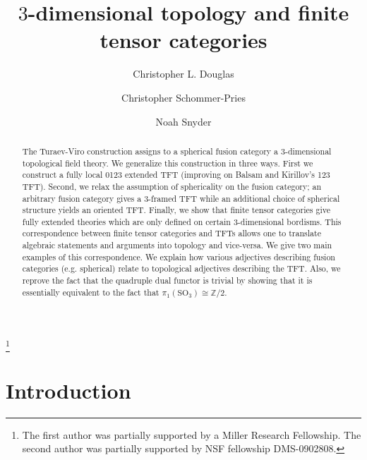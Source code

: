 \documentclass{amsart}
\begin{document}
\title{$3$-dimensional topology and finite tensor categories}

\begin{abstract}
The Turaev-Viro construction assigns to a spherical fusion category a 3-dimensional topological field theory.  We generalize this construction in three ways. First we construct a fully local 0123 extended TFT (improving on Balsam and Kirillov's 123 TFT).  Second, we relax the assumption of sphericality on the fusion category; an arbitrary fusion category gives a $3$-framed TFT while an additional choice of spherical structure yields an oriented TFT.  Finally, we show that finite tensor categories give fully extended theories which are only defined on certain $3$-dimensional bordisms.  This correspondence between finite tensor categories and TFTs allows one to translate algebraic statements and arguments into topology and vice-versa.  We give two main examples of this correspondence.  We explain how various adjectives describing fusion categories (e.g. spherical) relate to topological adjectives describing the TFT.  Also, we reprove the fact that the quadruple dual functor is trivial by showing that it is essentially equivalent to the fact that $\pi_1(\mathrm{SO}_3) \cong \mathbb{Z}/2$.
\end{abstract}
	
\author{Christopher L. Douglas}
\address{
}
	
\author{Christopher Schommer-Pries}
\address{
} %

\author{Noah Snyder}
\address{}

\thanks{The first author was partially supported by a Miller Research Fellowship.  The second author was partially supported by NSF fellowship DMS-0902808.}


\maketitle	
\setcounter{tocdepth}{3}
\tableofcontents

\section{Introduction}
\end{document}
